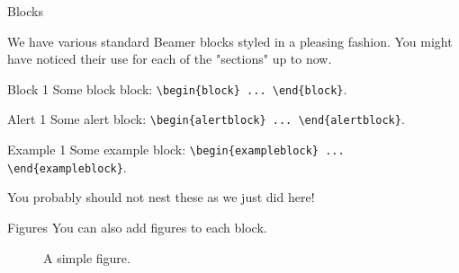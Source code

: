 \documentclass[final]{beamer}
\begin{document}
\begin{frame}[fragile]
\begin{columns}[t]
\separatorcolumn

\begin{column}{0.3\paperwidth}
\begin{block}{Blocks}

    We have various standard Beamer blocks styled in a pleasing fashion. You
    might have noticed their use for each of the "sections" up to now.

    \bigskip

    \begin{block}{Block 1}
        Some block block: \verb|\begin{block} ... \end{block}|.
    \end{block}

    \begin{alertblock}{Alert 1}
        Some alert block: \verb|\begin{alertblock} ... \end{alertblock}|.
    \end{alertblock}

    \begin{exampleblock}{Example 1}
        Some example block: \verb|\begin{exampleblock} ... \end{exampleblock}|.
    \end{exampleblock}

    \bigskip

    You probably should not nest these as we just did here!
\end{block}

\begin{block}{Figures}
    You can also add figures to each block.
    \bigskip

    \begin{figure}
    \caption{A simple figure.}
    \end{figure}


\end{block}
\end{column}
\end{columns}
\end{frame}
\end{document}
